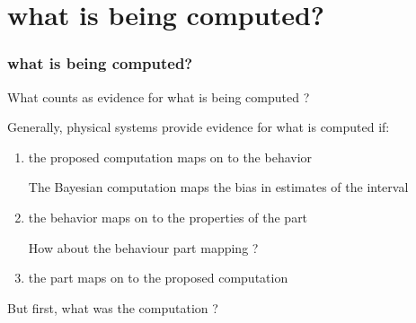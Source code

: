 \documentclass{beamer}
\begin{document}
\section{what is being computed?}
\begin{frame}
\frametitle{\textbf{what is being computed?} }
What counts as evidence for what is being computed ?

Generally, physical systems provide evidence for what is computed if:

\begin{enumerate}
    \item the proposed computation maps on to the behavior
    
    The Bayesian computation maps the bias in estimates of the interval

    \item the behavior maps on to the properties of the part
    
    How about the behaviour part mapping ?

    \item the part maps on to the proposed computation
\end{enumerate}

But first, what was the computation ?


\end{frame}

\end{document}
